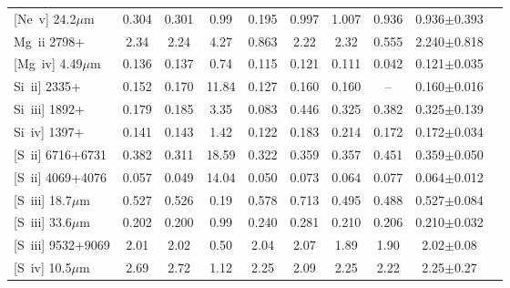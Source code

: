 \documentclass[twocolumn]{aastex62}
\begin{document}
\begin{CJK*}{UTF8}{gbsn}
\begin{table*}
\begin{center}
\begin{minipage}{13.5cm}
\begin{tabular}{@{}lccccccccc}
{[Ne~\sc v]} 24.2$\mu$m        & 0.304   & 0.301   & 0.99     & 0.195   & 0.997    & 1.007     & 0.936  & 0.936$\pm$0.393\\
{Mg~\sc ii} 2798+                    & 2.34     & 2.24     & 4.27     &  0.863  & 2.22      & 2.32       & 0.555  & 2.240$\pm$0.818\\
{[Mg~\sc iv]} 4.49$\mu$m       & 0.136   &  0.137  & 0.74     & 0.115    & 0.121    & 0.111     & 0.042  & 0.121$\pm$0.035\\
{Si~\sc ii]} 2335+                     & 0.152   & 0.170   & 11.84     & 0.127    & 0.160    & 0.160    & --  & 0.160$\pm$0.016\\
{Si~\sc iii]} 1892+                    & 0.179   &  0.185  & 3.35     & 0.083    & 0.446    & 0.325    & 0.382  & 0.325$\pm$0.139\\
{Si~\sc iv]} 1397+                    & 0.141   &  0.143  & 1.42     & 0.122    & 0.183    & 0.214    & 0.172  & 0.172$\pm$0.034\\
{[S~\sc ii]} 6716+6731             & 0.382   &  0.311  & 18.59     & 0.322   & 0.359     & 0.357    & 0.451  & 0.359$\pm$0.050\\
{[S~\sc ii]} 4069+4076             & 0.057   &  0.049  & 14.04     & 0.050   & 0.073     & 0.064    & 0.077  & 0.064$\pm$0.012\\
{[S~\sc iii]} 18.7$\mu$m          & 0.527   &  0.526  & 0.19     & 0.578   & 0.713     & 0.495    & 0.488  & 0.527$\pm$0.084\\
{[S~\sc iii]} 33.6$\mu$m          & 0.202   &  0.200  & 0.99     & 0.240   & 0.281     & 0.210    & 0.206  & 0.210$\pm$0.032\\
{[S~\sc iii]} 9532+9069            & 2.01     &  2.02    & 0.50     & 2.04     & 2.07       & 1.89      & 1.90  & 2.02$\pm$0.08\\
{[S~\sc iv]} 10.5$\mu$m          & 2.69     &  2.72    & 1.12     & 2.25     & 2.09       & 2.25      & 2.22   & 2.25$\pm$0.27\\

\hline
\end{tabular}
\end{minipage}
\end{center}
\end{table*}



\clearpage

\begin{thebibliography}{}


\end{thebibliography}
\end{CJK*}
\end{document}
